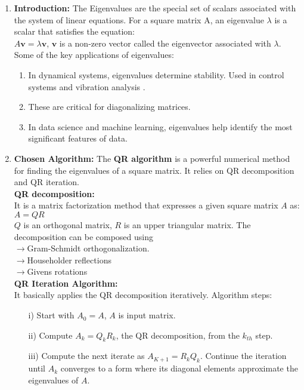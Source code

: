 \documentclass[journal]{IEEEtran}
\begin{document}
\begin{enumerate}
    \item \textbf{Introduction:} The Eigenvalues are the special set of scalars associated with the system of linear equations. For a square matrix A, an eigenvalue $\lambda$ is a scalar that satisfies the equation:\\$A\textbf{v}=\lambda\textbf{v}$, $\textbf{v}$ is a non-zero vector called the eigenvector associated with $\lambda$.\\Some of the key applications of eigenvalues:
    \begin{enumerate}
        \item In dynamical systems, eigenvalues determine stability. Used in control systems and vibration analysis .
        \item These are critical for diagonalizing matrices.
        \item In data science and machine learning, eigenvalues help identify the most significant features of data.
    \end{enumerate}
    \item \textbf{Chosen Algorithm:} The \textbf{QR algorithm} is a powerful numerical method for finding the eigenvalues of a square matrix. It relies on QR decomposition and QR iteration.\\ \textbf{QR decomposition:}\\ It is a matrix factorization method that expresses a given square matrix $A$ as:\\ $A=QR$ \\$Q$ is an orthogonal matrix, $R$ is an upper triangular matrix.
    The decomposition can be composed using\\ 
    $\rightarrow$Gram-Schmidt orthogonalization.\\
    $\rightarrow$Householder reflections\\
    $\rightarrow$Givens rotations\\
    \textbf{QR Iteration Algorithm:}\\ It basically applies the QR decomposition iteratively.
    Algorithm steps:
    \begin{enumerate}
        \item[i)] Start with $A_0=A$, $A$ is input matrix.
        \item[ii)] Compute $A_k=Q_kR_k$, the QR decomposition, from the $k_{th}$ step.
        \item[iii)] Compute the next iterate as $A_{K+1}=R_kQ_k$. Continue the iteration until $A_k$ converges to a form where its diagonal elements approximate the eigenvalues of $A$.

\end{enumerate}
\end{enumerate}
\end{document}
